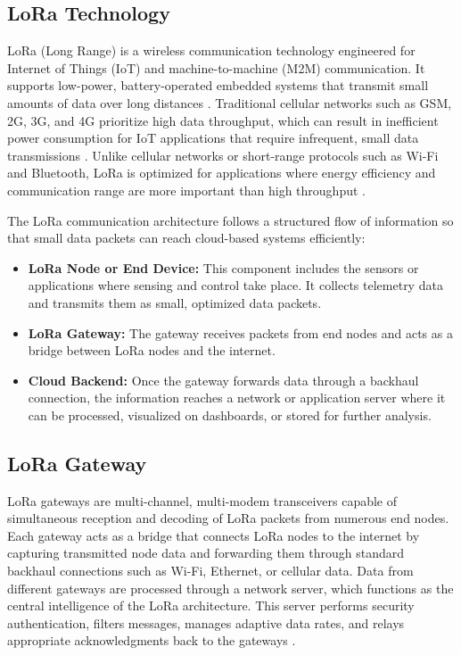 \subsection{LoRa Technology}

LoRa (Long Range) is a wireless communication technology engineered for Internet of Things (IoT) and machine-to-machine (M2M) communication. It supports low-power, battery-operated embedded systems that transmit small amounts of data over long distances \cite{orange2016lora_guide}. Traditional cellular networks such as GSM, 2G, 3G, and 4G prioritize high data throughput, which can result in inefficient power consumption for IoT applications that require infrequent, small data transmissions \cite{majeed2015comparative,lee2007wireless_protocols}. Unlike cellular networks or short-range protocols such as Wi-Fi and Bluetooth, LoRa is optimized for applications where energy efficiency and communication range are more important than high throughput \cite{devalal2018lora}.

The LoRa communication architecture follows a structured flow of information so that small data packets can reach cloud-based systems efficiently:

\begin{itemize}
    \item \textbf{LoRa Node or End Device:} This component includes the sensors or applications where sensing and control take place. It collects telemetry data and transmits them as small, optimized data packets.
    \item \textbf{LoRa Gateway:} The gateway receives packets from end nodes and acts as a bridge between LoRa nodes and the internet.
    \item \textbf{Cloud Backend:} Once the gateway forwards data through a backhaul connection, the information reaches a network or application server where it can be processed, visualized on dashboards, or stored for further analysis.
\end{itemize}

\subsection{LoRa Gateway}

LoRa gateways are multi-channel, multi-modem transceivers capable of simultaneous reception and decoding of LoRa packets from numerous end nodes. Each gateway acts as a bridge that connects LoRa nodes to the internet by capturing transmitted node data and forwarding them through standard backhaul connections such as Wi-Fi, Ethernet, or cellular data. Data from different gateways are processed through a network server, which functions as the central intelligence of the LoRa architecture. This server performs security authentication, filters messages, manages adaptive data rates, and relays appropriate acknowledgments back to the gateways \cite{orange2016lora_guide}.

